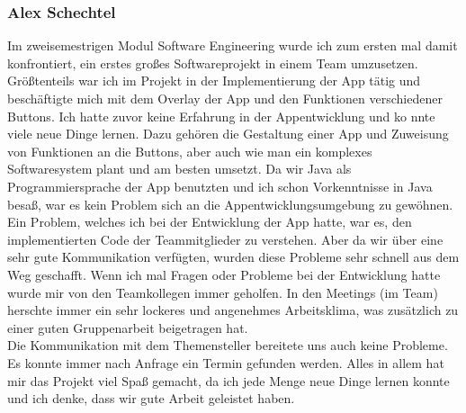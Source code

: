 \documentclass[10pt]{article}
\begin{document}
\subsubsection{Alex Schechtel}
    Im zweisemestrigen Modul Software Engineering wurde ich zum ersten mal damit konfrontiert, ein erstes großes Softwareprojekt in einem Team umzusetzen.
    Größtenteils war ich im Projekt in der Implementierung der App tätig und beschäftigte mich mit dem Overlay der App und den Funktionen verschiedener Buttons.
    Ich hatte zuvor keine Erfahrung in der Appentwicklung und ko    nnte viele neue Dinge lernen.
    Dazu gehören die Gestaltung einer App und Zuweisung von Funktionen an die Buttons,
    aber auch wie man ein komplexes Softwaresystem plant und am besten umsetzt. 
    Da wir Java als Programmiersprache der App benutzten und ich schon Vorkenntnisse in Java besaß, 
    war es kein Problem sich an die Appentwicklungsumgebung zu gewöhnen.\\ 
    Ein Problem, welches ich bei der Entwicklung der App hatte, war es, den implementierten Code der Teammitglieder zu verstehen.
    Aber da wir über eine sehr gute Kommunikation verfügten, wurden diese Probleme sehr schnell aus dem Weg geschafft.
    Wenn ich mal Fragen oder Probleme bei der Entwicklung hatte wurde mir von den Teamkollegen immer geholfen.
    In den Meetings (im Team) herschte immer ein sehr lockeres und angenehmes Arbeitsklima, 
    was zusätzlich zu einer guten Gruppenarbeit beigetragen hat. \\
    Die Kommunikation mit dem Themensteller bereitete uns auch keine Probleme. Es konnte immer nach Anfrage ein Termin gefunden werden. 
    Alles in allem hat mir das Projekt viel Spaß gemacht, da ich jede Menge neue Dinge lernen konnte und ich denke, 
    dass wir gute Arbeit geleistet haben.
\end{document}
